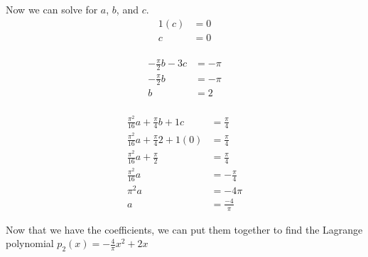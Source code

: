 \documentclass[12pt,twoside]{amsart}
\begin{document}
\begin{enumerate}
    Now we can solve for $a$, $b$, and $c$. \\
    
    \begin{align*}
        1(c) & = 0 \\
        c & = 0 \\
    \end{align*}

    \begin{align*}
        -\frac{\pi}{2}b - 3c & = -\pi \\
        -\frac{\pi}{2}b & = -\pi \\
        b & = 2 \\
    \end{align*}

    \begin{align*}
        \frac{\pi^2}{16}a + \frac{\pi}{4}b + 1c & = \frac{\pi}{4} \\
        \frac{\pi^2}{16}a + \frac{\pi}{4}2 + 1(0) & = \frac{\pi}{4} \\
        \frac{\pi^2}{16}a + \frac{\pi}{2} & = \frac{\pi}{4} \\
        \frac{\pi^2}{16}a & = -\frac{\pi}{4} \\
        \pi^2a & = -4\pi \\
        a & = \frac{-4}{\pi}
    \end{align*}
    
    Now that we have the coefficients, we can put them together to find the Lagrange polynomial $p_2(x) = -\frac{4}{\pi}x^2 + 2x$
    \bigskip


\end{enumerate}
\end{document}
